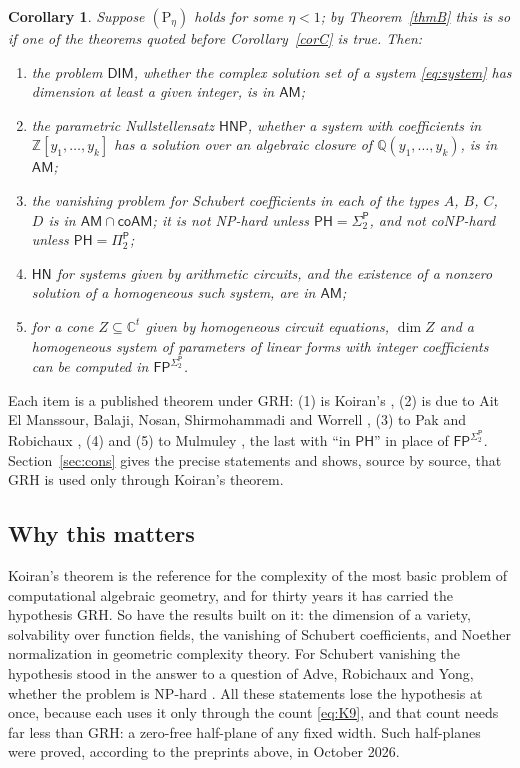 \documentclass[11pt]{amsart}
\newtheorem{corollaryx}[theorem]{Corollary}
\theoremstyle{definition}
\theoremstyle{remark}
\newcommand{\Z}{\mathbb Z}
\newcommand{\Q}{\mathbb Q}
\newcommand{\C}{\mathbb C}
\newcommand{\cl}[1]{\mathsf{#1}}
\newcommand{\HN}{\cl{HN}}
\newcommand{\AM}{\cl{AM}}
\newcommand{\Pitwo}{\Pi_2^{\cl P}}
\newcommand{\Sigtwo}{\Sigma_2^{\cl P}}
\newcommand{\Ph}[1]{(\mathrm P_{#1})}
\begin{document}
\begin{corollaryx}\label{corD}
Suppose $\Ph\eta$ holds for some $\eta<1$; by Theorem~\ref{thmB} this is so if one of the theorems quoted before Corollary~\ref{corC} is true. Then:
\begin{enumerate}
\item the problem $\cl{DIM}$, whether the complex solution set of a system \eqref{eq:system} has dimension at least a given integer, is in $\AM$;
\item the parametric Nullstellensatz $\cl{HNP}$, whether a system with coefficients in $\Z[y_1,\dots,y_k]$ has a solution over an algebraic closure of $\Q(y_1,\dots,y_k)$, is in $\AM$;
\item the vanishing problem for Schubert coefficients in each of the types $A$, $B$, $C$, $D$ is in $\AM\cap\cl{coAM}$; it is not NP-hard unless $\cl{PH}=\Sigtwo$, and not coNP-hard unless $\cl{PH}=\Pitwo$;
\item $\HN$ for systems given by arithmetic circuits, and the existence of a nonzero solution of a homogeneous such system, are in $\AM$;
\item for a cone $Z\subseteq\C^t$ given by homogeneous circuit equations, $\dim Z$ and a homogeneous system of parameters of linear forms with integer coefficients can be computed in $\cl{FP}^{\Sigtwo}$.
\end{enumerate}
\end{corollaryx}

Each item is a published theorem under GRH: (1) is Koiran's \cite[Theorem~4.1]{K97}, (2) is due to Ait El Manssour, Balaji, Nosan, Shirmohammadi and Worrell \cite[Theorem~1]{A24}, (3) to Pak and Robichaux \cite[Theorems~1.1 and~3.4, Corollary~1.4]{PR25}, (4) and (5) to Mulmuley \cite[Theorems~2.10 and~3.4]{M17}, the last with ``in $\cl{PH}$'' in place of $\cl{FP}^{\Sigtwo}$. Section~\ref{sec:cons} gives the precise statements and shows, source by source, that GRH is used only through Koiran's theorem.

\subsection{Why this matters}
Koiran's theorem is the reference for the complexity of the most basic problem of computational algebraic geometry, and for thirty years it has carried the hypothesis GRH. So have the results built on it: the dimension of a variety, solvability over function fields, the vanishing of Schubert coefficients, and Noether normalization in geometric complexity theory. For Schubert vanishing the hypothesis stood in the answer to a question of Adve, Robichaux and Yong, whether the problem is NP-hard \cite[Question~1.2 and Corollary~1.4]{PR25}. All these statements lose the hypothesis at once, because each uses it only through the count \eqref{eq:K9}, and that count needs far less than GRH: a zero-free half-plane of any fixed width. Such half-planes were proved, according to the preprints above, in October 2026.
\end{document}

